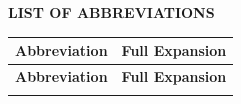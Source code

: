 \documentclass[12pt,a4paper,oneside]{report}
\begin{document}
\clearpage
\begin{center}
  {\fontsize{14}{17}\bfseries\MakeUppercase{List of Abbreviations}\par}
\end{center}
\vspace{0.6cm}

\begin{longtable}{@{}p{3.0cm}p{11.0cm}@{}}
\toprule
\textbf{Abbreviation} & \textbf{Full Expansion} \\
\midrule
\endfirsthead
\toprule
\textbf{Abbreviation} & \textbf{Full Expansion} \\
\midrule
\endhead
\bottomrule
\endfoot


\end{longtable}
\end{document}
